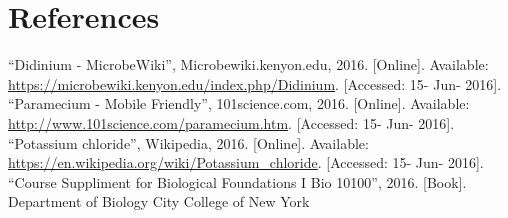 \documentclass[12pt]{article}
\begin{document}
\section{References}
\singlespacing
\noindent``Didinium - MicrobeWiki'', Microbewiki.kenyon.edu, 2016. [Online]. Available: \url{https://microbewiki.kenyon.edu/index.php/Didinium}. [Accessed: 15- Jun- 2016].\\

\noindent``Paramecium - Mobile Friendly'', 101science.com, 2016. [Online]. Available: \url{http://www.101science.com/paramecium.htm}. [Accessed: 15- Jun- 2016].\\

\noindent``Potassium chloride'', Wikipedia, 2016. [Online]. Available: \url{https://en.wikipedia.org/wiki/Potassium\_chloride}. [Accessed: 15- Jun- 2016].\\

\noindent ``Course Suppliment for Biological Foundations I Bio 10100'', 2016. [Book]. Department of Biology City College of New York
\end{document}
